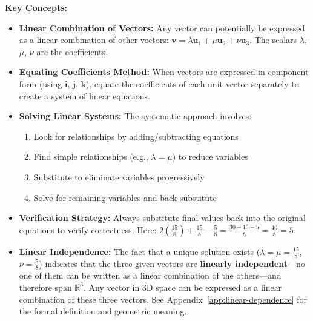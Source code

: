 \begin{takeaways}
\textbf{Key Concepts:}
\begin{itemize}
    \item \textbf{Linear Combination of Vectors:} Any vector can potentially be expressed as a linear combination of other vectors: $\mathbf{v} = \lambda\mathbf{u}_1 + \mu\mathbf{u}_2 + \nu\mathbf{u}_3$. The scalars $\lambda$, $\mu$, $\nu$ are the coefficients.
    
    \item \textbf{Equating Coefficients Method:} When vectors are expressed in component form (using $\mathbf{i}$, $\mathbf{j}$, $\mathbf{k}$), equate the coefficients of each unit vector separately to create a system of linear equations.
    
    \item \textbf{Solving Linear Systems:} The systematic approach involves:
    \begin{enumerate}
        \item Look for relationships by adding/subtracting equations
        \item Find simple relationships (e.g., $\lambda = \mu$) to reduce variables
        \item Substitute to eliminate variables progressively
        \item Solve for remaining variables and back-substitute
    \end{enumerate}
    
    \item \textbf{Verification Strategy:} Always substitute final values back into the original equations to verify correctness. Here: $2(\frac{15}{8}) + \frac{15}{8} - \frac{5}{8} = \frac{30 + 15 - 5}{8} = \frac{40}{8} = 5$ \checkmark
    
    \item \textbf{Linear Independence:} The fact that a unique solution exists ($\lambda = \mu = \frac{15}{8}$, $\nu = \frac{5}{8}$) indicates that the three given vectors are \textbf{linearly independent}---no one of them can be written as a linear combination of the others---and therefore span $\mathbb{R}^3$. Any vector in 3D space can be expressed as a linear combination of these three vectors. See Appendix~\ref{app:linear-dependence} for the formal definition and geometric meaning.
\end{itemize}
\end{takeaways}

\vspace{1em}

